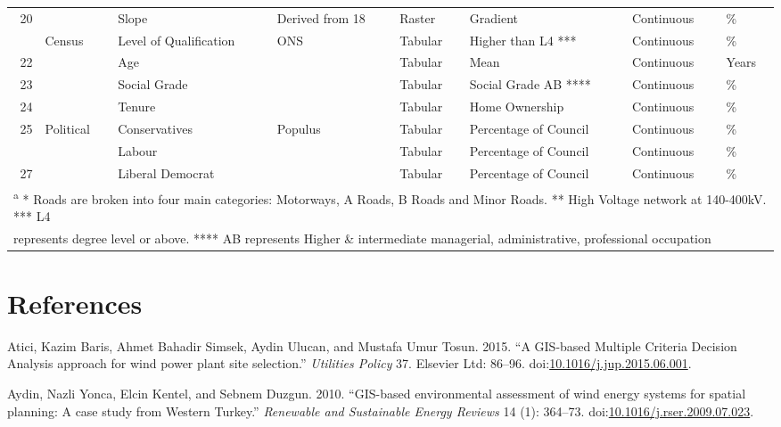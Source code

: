 \documentclass[a4paper,]{article}
\theoremstyle{definition}
\theoremstyle{definition}
\theoremstyle{remark}
\begin{document}
{\begin{landscape}
\begin{table}
{\begin{tabular}[t]{rlllllll}
20 &  & Slope & Derived from 18 & Raster & Gradient & Continuous & \%\\
\addlinespace
21 & Census & Level of Qualification & ONS & Tabular & Higher than L4 *** & Continuous & \%\\
22 &  & Age &  & Tabular & Mean & Continuous & Years\\
23 &  & Social Grade &  & Tabular & Social Grade AB **** & Continuous & \%\\
24 &  & Tenure &  & Tabular & Home Ownership & Continuous & \%\\
25 & Political & Conservatives & Populus & Tabular & Percentage of Council & Continuous & \%\\
\addlinespace
26 &  & Labour &  & Tabular & Percentage of Council & Continuous & \%\\
27 &  & Liberal Democrat &  & Tabular & Percentage of Council & Continuous & \%\\
\bottomrule
\multicolumn{8}{l}{\textsuperscript{a} * Roads are broken into four main categories: Motorways, A Roads, B Roads and Minor Roads. ** High Voltage network at 140-400kV. *** L4}\\
\multicolumn{8}{l}{represents degree level or above. **** AB represents Higher \& intermediate managerial, administrative, professional occupation}\\
\end{tabular}}
\end{table}
\end{landscape}

\section*{References}\label{references}

\hypertarget{refs}{}
\hypertarget{ref-Atici2015}{}
Atici, Kazim Baris, Ahmet Bahadir Simsek, Aydin Ulucan, and Mustafa Umur
Tosun. 2015. ``A GIS-based Multiple Criteria Decision Analysis approach
for wind power plant site selection.'' \emph{Utilities Policy} 37.
Elsevier Ltd: 86--96.
doi:\href{https://doi.org/10.1016/j.jup.2015.06.001}{10.1016/j.jup.2015.06.001}.

\hypertarget{ref-Aydin2010}{}
Aydin, Nazli Yonca, Elcin Kentel, and Sebnem Duzgun. 2010. ``GIS-based
environmental assessment of wind energy systems for spatial planning: A
case study from Western Turkey.'' \emph{Renewable and Sustainable Energy
Reviews} 14 (1): 364--73.
doi:\href{https://doi.org/10.1016/j.rser.2009.07.023}{10.1016/j.rser.2009.07.023}.

}
\end{document}
